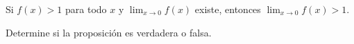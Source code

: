 \item Si $f(x) > 1$ para todo $x$ y $\lim_{x \to 0} f(x)$ existe, entonces $\lim_{x \to 0} f(x) > 1$.
\par
Determine si la proposición es verdadera o falsa.

